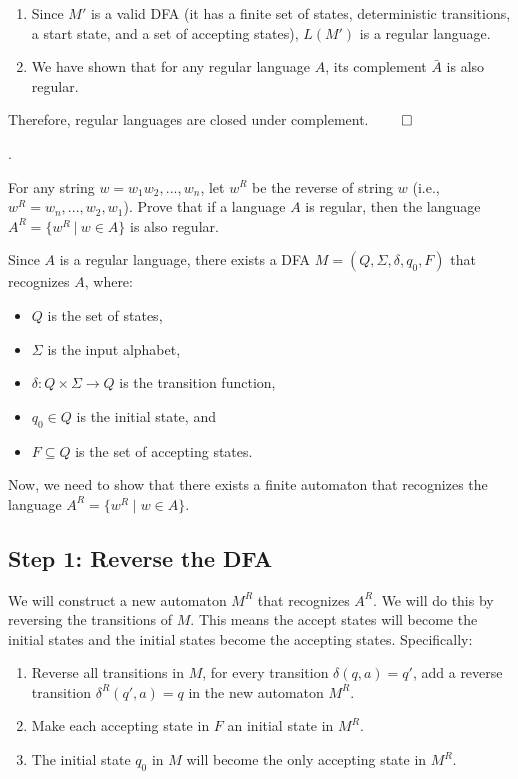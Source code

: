 \documentclass[12pt]{article}
\newcounter{quesnum}
\newcommand{\question}[2][??]{
\begin{list}{\labelitemi}{\leftmargin=2em}
\item [\arabic{quesnum}.] {} {#2}
\end{list}
\addtocounter{quesnum}{1}
}
\begin{document}
{\begin{enumerate}
    \item Since $M'$ is a valid DFA (it has a finite set of states, deterministic transitions, a start state, and a set of accepting states), $L(M')$ is a regular language.
    
    \item We have shown that for any regular language $A$, its complement $\bar{A}$ is also regular.
\end{enumerate}

Therefore, regular languages are closed under complement. $\qed$

}

\vspace{12pt}

\question[3]{
For any string $w = w_1w_2,...,w_n$, let $w^R$ be the reverse of string $w$ (i.e., $w^R=w_n,...,w_2,w_1$). Prove that if a language $A$ is regular, then the language $A^R = \{w^R \ | \ w \in A\}$ is also regular.


}

Since \( A \) is a regular language, there exists a DFA \( M = (Q, \Sigma, \delta, q_0, F) \) that recognizes \( A \), where:

\begin{itemize}
    \item \( Q \) is the set of states,
    \item \( \Sigma \) is the input alphabet,
    \item \( \delta: Q \times \Sigma \to Q \) is the transition function,
    \item \( q_0 \in Q \) is the initial state, and
    \item \( F \subseteq Q \) is the set of accepting states.
\end{itemize}

Now, we need to show that there exists a finite automaton that recognizes the language \( A^R = \{ w^R \mid w \in A \} \).

\subsection*{Step 1: Reverse the DFA}
We will construct a new automaton \( M^R \) that recognizes \( A^R \). We will do this by reversing the transitions of \( M \). This means the accept states will become the initial states and the initial states become the accepting states. Specifically:

\begin{enumerate}
    \item Reverse all transitions in \( M \), for every transition \( \delta(q, a) = q' \), add a reverse transition \( \delta^R(q', a) = q \) in the new automaton \( M^R \).
    \item Make each accepting state in \( F \) an initial state in \( M^R \).
    \item The initial state \( q_0 \) in \( M \) will become the only accepting state in \( M^R \).
\end{enumerate}
\end{document}
